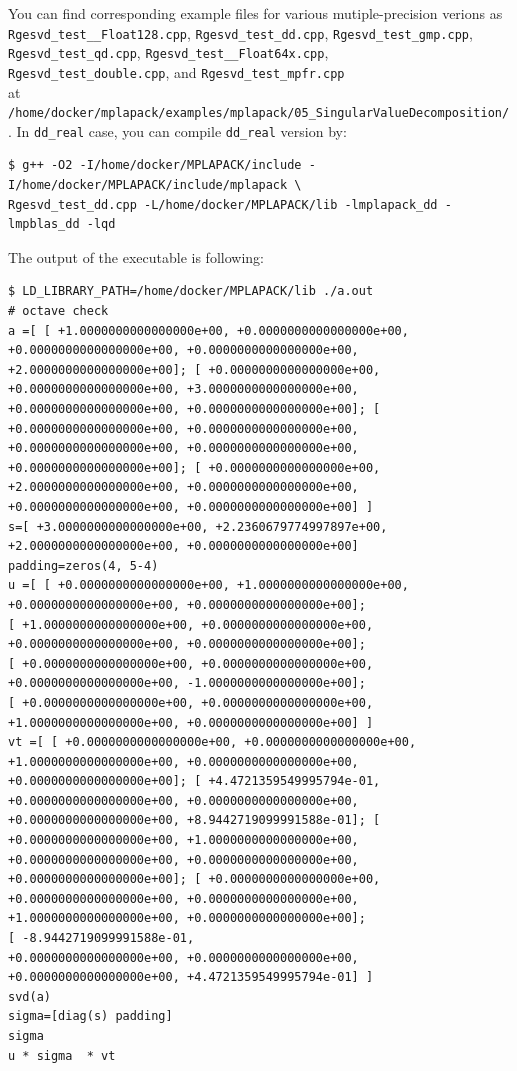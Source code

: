 \documentclass[12pt]{article}
\begin{document}
You can find corresponding example files for various mutiple-precision verions as {\tt Rgesvd\_test\_\_Float128.cpp},
{\tt Rgesvd\_test\_dd.cpp}, {\tt Rgesvd\_test\_gmp.cpp}, {\tt Rgesvd\_test\_qd.cpp},
{\tt Rgesvd\_test\_\_Float64x.cpp}, \\
{\tt Rgesvd\_test\_double.cpp},  and {\tt Rgesvd\_test\_mpfr.cpp}\\
at {\tt /home/docker/mplapack/examples/mplapack/05\_SingularValueDecomposition/}.
In {\tt dd\_real} case, you can compile {\tt dd\_real} version by:
\begin{verbatim}
$ g++ -O2 -I/home/docker/MPLAPACK/include -I/home/docker/MPLAPACK/include/mplapack \
Rgesvd_test_dd.cpp -L/home/docker/MPLAPACK/lib -lmplapack_dd -lmpblas_dd -lqd
\end{verbatim}
The output of the executable is following:
{\footnotesize
\begin{verbatim}
$ LD_LIBRARY_PATH=/home/docker/MPLAPACK/lib ./a.out
# octave check
a =[ [ +1.0000000000000000e+00, +0.0000000000000000e+00, +0.0000000000000000e+00, +0.0000000000000000e+00, 
+2.0000000000000000e+00]; [ +0.0000000000000000e+00, +0.0000000000000000e+00, +3.0000000000000000e+00,
+0.0000000000000000e+00, +0.0000000000000000e+00]; [ +0.0000000000000000e+00, +0.0000000000000000e+00, 
+0.0000000000000000e+00, +0.0000000000000000e+00, +0.0000000000000000e+00]; [ +0.0000000000000000e+00, 
+2.0000000000000000e+00, +0.0000000000000000e+00, +0.0000000000000000e+00, +0.0000000000000000e+00] ]
s=[ +3.0000000000000000e+00, +2.2360679774997897e+00, +2.0000000000000000e+00, +0.0000000000000000e+00]
padding=zeros(4, 5-4)
u =[ [ +0.0000000000000000e+00, +1.0000000000000000e+00, +0.0000000000000000e+00, +0.0000000000000000e+00];
[ +1.0000000000000000e+00, +0.0000000000000000e+00, +0.0000000000000000e+00, +0.0000000000000000e+00];
[ +0.0000000000000000e+00, +0.0000000000000000e+00, +0.0000000000000000e+00, -1.0000000000000000e+00];
[ +0.0000000000000000e+00, +0.0000000000000000e+00, +1.0000000000000000e+00, +0.0000000000000000e+00] ]
vt =[ [ +0.0000000000000000e+00, +0.0000000000000000e+00, +1.0000000000000000e+00, +0.0000000000000000e+00, 
+0.0000000000000000e+00]; [ +4.4721359549995794e-01, +0.0000000000000000e+00, +0.0000000000000000e+00, 
+0.0000000000000000e+00, +8.9442719099991588e-01]; [ +0.0000000000000000e+00, +1.0000000000000000e+00, 
+0.0000000000000000e+00, +0.0000000000000000e+00, +0.0000000000000000e+00]; [ +0.0000000000000000e+00, 
+0.0000000000000000e+00, +0.0000000000000000e+00, +1.0000000000000000e+00, +0.0000000000000000e+00];
[ -8.9442719099991588e-01, 
+0.0000000000000000e+00, +0.0000000000000000e+00, +0.0000000000000000e+00, +4.4721359549995794e-01] ]
svd(a)
sigma=[diag(s) padding]
sigma
u * sigma  * vt
\end{verbatim}
}
\end{document}
